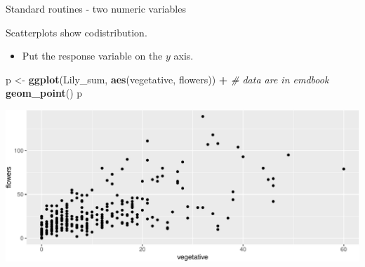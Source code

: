 \documentclass[
  ignorenonframetext,
]{beamer}
\newenvironment{Shaded}{\begin{snugshade}}{\end{snugshade}}
\newcommand{\CommentTok}[1]{\textcolor[rgb]{0.56,0.35,0.01}{\textit{#1}}}
\newcommand{\KeywordTok}[1]{\textcolor[rgb]{0.13,0.29,0.53}{\textbf{#1}}}
\newcommand{\NormalTok}[1]{#1}
\newcommand{\OperatorTok}[1]{\textcolor[rgb]{0.81,0.36,0.00}{\textbf{#1}}}
\newcommand{\StringTok}[1]{\textcolor[rgb]{0.31,0.60,0.02}{#1}}
\providecommand{\tightlist}{%
  \setlength{\itemsep}{0pt}\setlength{\parskip}{0pt}}
\begin{document}
\begin{frame}[fragile]{Standard routines - two numeric variables}
\protect\hypertarget{standard-routines---two-numeric-variables}{}

Scatterplots show codistribution.

\begin{itemize}
\tightlist
\item
  Put the response variable on the \(y\) axis.
\end{itemize}

\scriptsize

\begin{Shaded}
\begin{Highlighting}[]
\NormalTok{p <-}\StringTok{ }\KeywordTok{ggplot}\NormalTok{(Lily_sum, }\KeywordTok{aes}\NormalTok{(vegetative, flowers)) }\OperatorTok{+}\StringTok{ }\CommentTok{# data are in emdbook}
\StringTok{  }\KeywordTok{geom_point}\NormalTok{()}
\NormalTok{p}
\end{Highlighting}
\end{Shaded}

\includegraphics{data_viz_files/figure-beamer/unnamed-chunk-5-1.pdf}

\end{frame}
\end{document}
